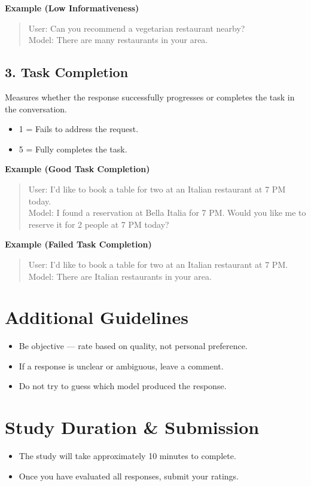 \textbf{Example (Low Informativeness)}
\begin{quote}
User: Can you recommend a vegetarian restaurant nearby?\\
Model: There are many restaurants in your area.
\end{quote}

\subsection*{3. Task Completion}
Measures whether the response successfully progresses or completes the task in the conversation.

\begin{itemize}
    \item 1 = Fails to address the request.
    \item 5 = Fully completes the task.
\end{itemize}

\textbf{Example (Good Task Completion)}
\begin{quote}
User: I’d like to book a table for two at an Italian restaurant at 7 PM today.\\
Model: I found a reservation at Bella Italia for 7 PM. Would you like me to reserve it for 2 people at 7 PM today?
\end{quote}

\textbf{Example (Failed Task Completion)}
\begin{quote}
User: I’d like to book a table for two at an Italian restaurant at 7 PM.\\
Model: There are Italian restaurants in your area.
\end{quote}

\section*{Additional Guidelines}
\begin{itemize}
    \item Be objective --- rate based on quality, not personal preference.
    \item If a response is unclear or ambiguous, leave a comment.
    \item Do not try to guess which model produced the response.
\end{itemize}

\section*{Study Duration \& Submission}
\begin{itemize}
    \item The study will take approximately 10 minutes to complete.
    \item Once you have evaluated all responses, submit your ratings.
\end{itemize}